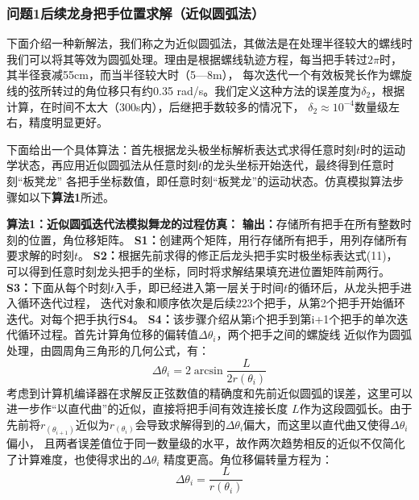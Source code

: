 \documentclass{cumcmthesis1}
\begin{document}
\subsubsection{\textbf{问题1}后续龙身把手位置求解（近似圆弧法）}
下面介绍一种新解法，我们称之为近似圆弧法，其做法是在处理半径较大的螺线时我们可以将其等效为圆弧处理。理由是根据螺线轨迹方程，每当把手转过$2\pi$时，其半径衰减55cm，而当半径较大时（5—8m），
每次迭代一个有效板凳长作为螺旋线的弦所转过的角位移只有约0.35 rad/s。我们定义这种方法的误差度为$\delta_2$，根据计算，在时间不太大（300s内），后继把手数较多的情况下，
$\delta_2 \approx 10^{-4}$数量级左右，精度明显更好。
\par
下面给出一个具体算法：首先根据龙头极坐标解析表达式求得任意时刻$t$时的运动学状态，再应用近似圆弧法从任意时刻$t$的龙头坐标开始迭代，最终得到任意时刻“板凳龙”
各把手坐标数值，即任意时刻“板凳龙”的运动状态。仿真模拟算法步骤如以下\textbf{算法1}所述。
\par
\textbf{算法1：近似圆弧迭代法模拟舞龙的过程仿真：}
\newline
\noindent
\textbf{输出：}存储所有把手在所有整数时刻的位置，角位移矩阵。
\newline
\noindent
\textbf{S1：}创建两个矩阵，用行存储所有把手，用列存储所有要求解的时刻$t$。
\newline
\noindent
\textbf{S2：}根据先前求得的修正后龙头把手实时极坐标表达式(11)，
可以得到任意时刻龙头把手的坐标，同时将求解结果填充进位置矩阵前两行。
\newline
\noindent
\textbf{S3：}下面从每个时刻$t$入手，即已经进入第一层关于时间$t$的循环后，从龙头把手进入循环迭代过程，
迭代对象和顺序依次是后续223个把手，从第2个把手开始循环迭代。对每个把手执行\textbf{S4}。
\newline
\noindent
\textbf{S4：}该步骤介绍从第i个把手到第i+1个把手的单次迭代循环过程。首先计算角位移的偏转值$\Delta \theta_i$，两个把手之间的螺旋线
近似作为圆弧处理，由圆周角三角形的几何公式，有：
\begin{equation}
    \Delta \theta_i=2\arcsin\frac{L}{2 r(\theta_i)}
\end{equation}
考虑到计算机编译器在求解反正弦数值的精确度和先前近似圆弧的误差，这里可以进一步作“以直代曲”的近似，直接将把手间有效连接长度
$L$作为这段圆弧长。由于先前将$r_(\theta_{i+1})$近似为$r_(\theta_{i})$会导致求解得到的$\Delta \theta_i$偏大，而这里以直代曲又使得$\Delta \theta_i$偏小，
且两者误差值位于同一数量级的水平，故作两次趋势相反的近似不仅简化了计算难度，也使得求出的$\Delta \theta_i$
精度更高。角位移偏转量方程为：
\begin{equation}
    \Delta \theta_i=\frac{L}{ r(\theta_i)}
\end{equation}
\end{document}
